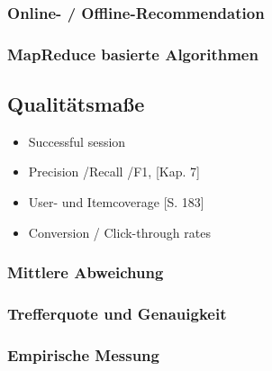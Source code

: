\subsubsection{Online- / Offline-Recommendation}
\subsubsection{MapReduce basierte Algorithmen}


\subsection{Qualitätsmaße}\label{sec:measures}

	\begin{itemize}
	\item Successful session \citep{hb_18,Smyth05alive-user}
	\item Precision /Recall /F1, \citep{rs}[Kap. 7]
	\item User- und Itemcoverage \citep{rs}[S. 183]
	\item Conversion / Click-through rates
	\end{itemize}

\subsubsection{Mittlere Abweichung}\newpage
\subsubsection{Trefferquote und Genauigkeit}\newpage
\subsubsection{Empirische Messung}\newpage

\newpage
